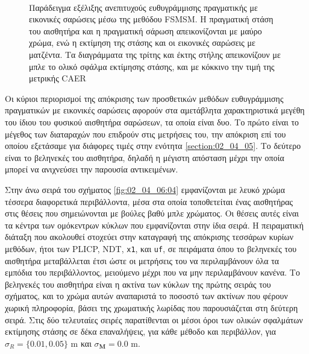 \begin{figure}[h]
  \begin{subfigure}{\linewidth}\centering
      
    \end{subfigure}\vspace{1cm}\\
    \begin{subfigure}{\linewidth}
      
    \end{subfigure}
  \vspace{0.5cm}
  \caption{\small Παράδειγμα εξέλιξης ανεπιτυχούς ευθυγράμμισης πραγματικής με
           εικονικές σαρώσεις μέσω της μεθόδου FSMSM. Η πραγματική στάση του
           αισθητήρα και η πραγματική σάρωση απεικονίζονται με μαύρο χρώμα, ενώ
           η εκτίμηση της στάσης και οι εικονικές σαρώσεις με ματζέντα. Τα
           διαγράμματα της τρίτης και έκτης στήλης απεικονίζουν με μπλε το
           ολικό σφάλμα εκτίμησης στάσης, και με κόκκινο την τιμή της μετρικής
           CAER}
  \label{fig:02_04_06:03}
\end{figure}

Οι κύριοι περιορισμοί της απόκρισης των προσθετικών μεθόδων ευθυγράμμισης
πραγματικών με εικονικές σαρώσεις αφορούν στα αμετάβλητα χαρακτηριστικά μεγέθη
του ίδιου του φυσικού αισθητήρα σαρώσεων, τα οποία είναι δυο. Το πρώτο είναι το
μέγεθος των διαταραχών που επιδρούν στις μετρήσεις του, την απόκριση επί του
οποίου εξετάσαμε για διάφορες τιμές στην ενότητα \ref{section:02_04_05}. Το
δεύτερο είναι το βεληνεκές του αισθητήρα, δηλαδή η μέγιστη απόσταση μέχρι την
οποία μπορεί να ανιχνεύσει την παρουσία αντικειμένων.

Στην άνω σειρά του σχήματος \ref{fig:02_04_06:04} εμφανίζονται με λευκό χρώμα
τέσσερα διαφορετικά περιβάλλοντα, μέσα στα οποία τοποθετείται ένας αισθητήρας
στις θέσεις που σημειώνονται με βούλες βαθύ μπλε χρώματος. Οι θέσεις αυτές
είναι τα κέντρα των ομόκεντρων κύκλων που εμφανίζονται στην ίδια σειρά. Η
πειραματική διάταξη που ακολουθεί στοχεύει στην καταγραφή της απόκρισης
τεσσάρων κυρίων μεθόδων, ήτοι των PLICP, NDT, \texttt{x1}, και \texttt{uf}, σε
πειράματα όπου το βεληνεκές του αισθητήρα μεταβάλλεται έτσι ώστε οι μετρήσεις
του να περιλαμβάνουν όλα τα εμπόδια του περιβάλλοντος, μειούμενο μέχρι που να
μην περιλαμβάνουν κανένα. Το βεληνεκές του αισθητήρα είναι η ακτίνα των κύκλων
της πρώτης σειράς του σχήματος, και το χρώμα αυτών αναπαριστά το ποσοστό των
ακτίνων που φέρουν χωρική πληροφορία, βάσει της χρωματικής λωρίδας που
παρουσιάζεται στη δεύτερη σειρά. Στις δύο τελευταίες σειρές παρατίθενται οι
μέσοι όροι των ολικών σφαλμάτων εκτίμησης στάσης σε δέκα επαναλήψεις,
για κάθε μέθοδο και περιβάλλον, για $\sigma_R = \{0.01, 0.05\}$ m και
$\sigma_{\bm{M}} = 0.0$ m.

